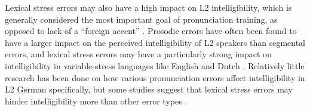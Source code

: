 \documentclass[a4paper]{article}
\newcommand{\TODO}[1]{{\color{red}\textbf{[TODO #1]}}}
\begin{document}
	Lexical stress errors may also have a high impact on L2 intelligibility, which is generally considered the most important goal of pronunciation training, as opposed to lack of a ``foreign accent'' \cite{Munro1999,Field2005}.
	Prosodic errors have often been found to have a larger impact on the perceived intelligibility of L2 speakers than segmental errors, 
	and 
	lexical stress errors may have a particularly strong impact on intelligibility in variable-stress languages like English and Dutch \cite{Cutler2005,Field2005}.
	Relatively little research has been done on how various pronunciation errors affect intelligibility in L2 German specifically, but some studies suggest that 
	lexical stress errors
	may hinder intelligibility more than other error types
	\cite{Hirschfeld1994,Hirschfeld2007}.
	
\end{document}
